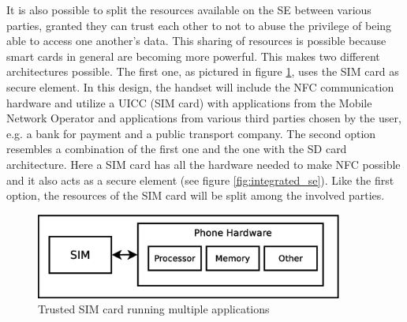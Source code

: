 \begin{enumerate}
\begin{item}
It is also possible to split the resources available on the SE between various parties, granted they can trust each other to not to abuse the privilege of being able to access one another's data.
This sharing of resources is possible because smart cards in general are becoming more powerful.
This makes two different architectures possible.
The first one, as pictured in figure \ref{fig:sim_se}, uses the SIM card as secure element.
In this design, the handset will include the NFC communication hardware and utilize a UICC (SIM card) with applications from the Mobile Network Operator and applications from various third parties chosen by the user, e.g. a bank for payment and a public transport company. 
The second option resembles a combination of the first one and the one with the SD card architecture.
Here a SIM card has all the hardware needed to make NFC possible and it also acts as a secure element (see figure \ref{fig:integrated_se}).
Like the first option, the resources of the SIM card will be split among the involved parties.
\begin{figure}
\includegraphics[width=0.9\textwidth]{images/SIM_is_SE}
\caption[Trusted SIM cards]
{
Trusted SIM card running multiple applications
}
\label{fig:sim_se}
\end{figure}
\end{item}

\end{enumerate}








